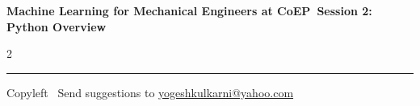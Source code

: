 \documentclass[8pt,landscape]{article}
\begin{document}
\footnotesize

\begin{center}
\Large{\textbf{Machine Learning for Mechanical Engineers at CoEP\ Session 2: Python Overview}}
\end{center}

\begin{multicols}{2}

\end{multicols}

\rule{\linewidth}{0.25pt}
\scriptsize
Copyleft \textcopyleft\  Send suggestions to
\href{http://www.yogeshkulkarni.com}{yogeshkulkarni@yahoo.com}
\end{document}
